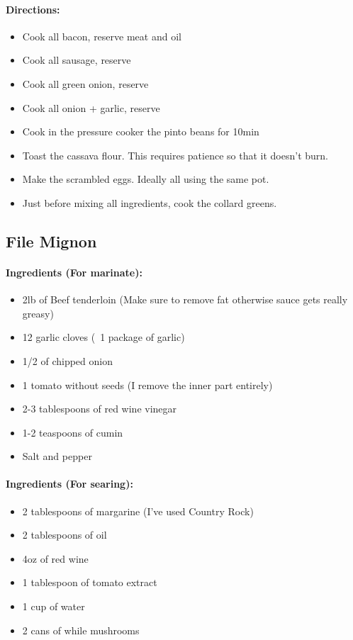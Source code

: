 \documentclass{article}
\begin{document}
\paragraph{Directions:}
\begin{itemize}
	\item Cook all bacon, reserve meat and oil
	\item Cook all sausage, reserve	
	\item Cook all green onion, reserve
	\item Cook all onion + garlic, reserve
	\item Cook in the pressure cooker the pinto beans for 10min
	\item Toast the cassava flour. This requires patience so that it doesn't burn.
	\item Make the scrambled eggs. Ideally all using the same pot.
	\item Just before mixing all ingredients, cook the collard greens.
\end{itemize}

\subsection{File Mignon}

\paragraph{Ingredients (For marinate):}
\begin{itemize}
	\item 2lb of Beef tenderloin (Make sure to remove fat otherwise sauce gets really greasy)
	\item 12 garlic cloves (~1 package of garlic)
	\item 1/2 of chipped onion
	\item 1 tomato without seeds (I remove the inner part entirely)
	\item 2-3 tablespoons of red wine vinegar
	\item 1-2 teaspoons of cumin
	\item Salt and pepper
\end{itemize}

\paragraph{Ingredients (For searing):}
\begin{itemize}
	\item 2 tablespoons of margarine (I've used Country Rock)
	\item 2 tablespoons of oil
	\item 4oz of red wine
	\item 1 tablespoon of tomato extract
	\item 1 cup of water
	\item 2 cans of while mushrooms
\end{itemize}
\end{document}
